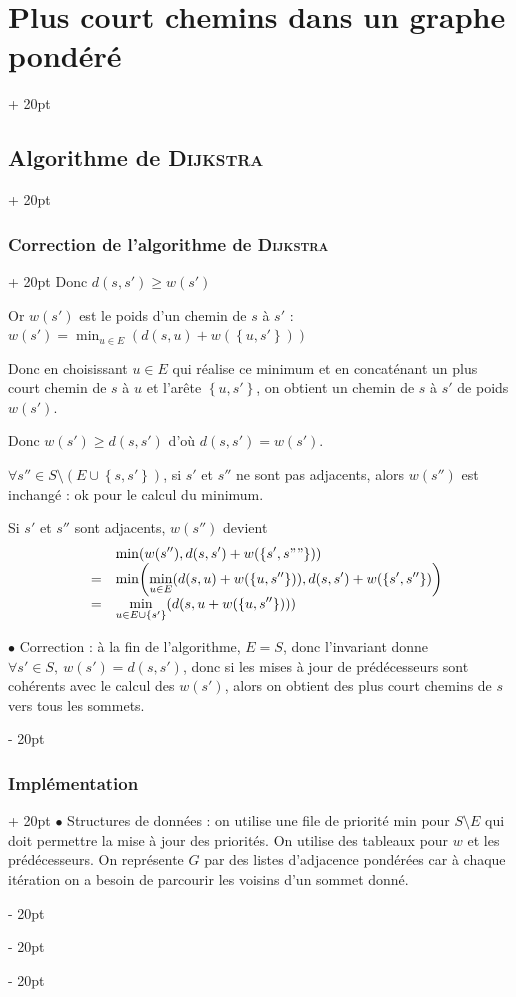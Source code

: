 \documentclass[a4paper, 12pt, twoside]{article}
\newcommand{\lr}[1]{\left( #1 \right)}
\newcommand{\set}[1]{\left\{ #1 \right\}}
\renewcommand{\ge}{\geqslant}
\newcommand{\ind}[1][20pt]{\advance\leftskip + #1}
\newcommand{\deind}[1][20pt]{\advance\leftskip - #1}
\newenvironment{indt}[2][20pt]{#2 \par \ind[#1]}{\par \deind} %
\begin{document}
\begin{indt}{\section{Plus court chemins dans un graphe pondéré}}
\begin{indt}{\subsection{Algorithme de \textsc{Dijkstra}}}
\begin{indt}{\subsubsection{Correction de l'algorithme de \textsc{Dijkstra}}}
                Donc $d(s, s') \ge w(s')$

                Or $w(s')$ est le poids d'un chemin de $s$ à $s'$ : $w(s') = \displaystyle \min_{u \in E}(d(s, u) + w(\set{u, s'}))$

                Donc en choisissant $u \in E$ qui réalise ce minimum et en concaténant un plus court chemin de $s$ à $u$ et l'arête $\set{u, s'}$, on obtient un chemin de $s$ à $s'$ de poids $w(s')$.

                Donc $w(s') \ge d(s, s')$ d'où $d(s, s') = w(s')$.

                \vspace{6pt}
                
                $\forall s'' \in S \setminus (E \cup \set{s, s'})$, si $s'$ et $s''$ ne sont pas adjacents, alors $w(s'')$ est inchangé : ok pour le calcul du minimum.

                Si $s'$ et $s''$ sont adjacents, $w(s'')$ devient
                \[
                    \begin{array}{rcl}
                        &&\displaystyle \min(w(s''), d(s, s') + w(\set{s', s""}))
                        \\
                        &=& \displaystyle \min\!\lr{\min_{u \in E}(d(s, u) + w(\set{u, s''})), d(s, s') + w(\set{s', s''})}
                        \\
                        &=& \displaystyle \min_{u \in E \cup \set{s'}} (d(s, u + w(\set{u, s''})))
                    \end{array}
                \]

                \vspace{6pt}
                
                $\bullet$ Correction : à la fin de l'algorithme, $E = S$, donc l'invariant donne $\forall s' \in S,\ w(s') = d(s, s')$, donc si les mises à jour de prédécesseurs sont cohérents avec le calcul des $w(s')$, alors on obtient des plus court chemins de $s$ vers tous les sommets.
            \end{indt}

            \vspace{12pt}
            
            \begin{indt}{\subsubsection{Implémentation}}
                $\bullet$ Structures de données : on utilise une file de priorité min pour $S \setminus E$ qui doit permettre la mise à jour des priorités. On utilise des tableaux pour $w$ et les prédécesseurs. On représente $G$ par des listes d'adjacence pondérées car à chaque itération on a besoin de parcourir les voisins d'un sommet donné.


\end{indt}
\end{indt}
\end{indt}
\end{document}
